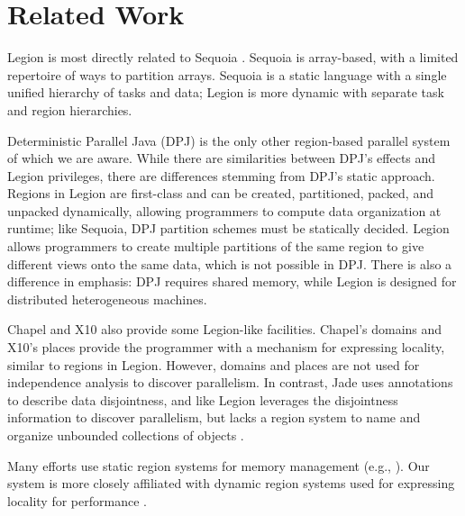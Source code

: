 
\section{Related Work}
\label{sec:related}
Legion is most directly related to Sequoia \cite{Fatahalian06}.  Sequoia is array-based, with
a limited repertoire of ways to partition arrays.  Sequoia is a static language with a single unified hierarchy
of tasks and data; Legion is more dynamic with separate task and region hierarchies.

Deterministic Parallel Java (DPJ) is the only other region-based parallel system of which we are
aware\cite{Bocchino09}.  While there are similarities between DPJ's effects and Legion privileges, 
there are differences stemming from DPJ's static approach.
Regions in Legion are first-class and can be created, partitioned, packed, and unpacked 
dynamically, allowing programmers to compute data organization at runtime; like Sequoia, DPJ
partition schemes must be statically decided.  Legion allows 
programmers to create multiple partitions of the same region to give different 
views onto the same data, which is not possible in DPJ.  
There is also a difference in emphasis: DPJ requires shared memory, while Legion 
is designed for distributed heterogeneous machines.

Chapel \cite{Chamberlain:Chapel} and X10 \cite{X1005} also provide some Legion-like facilities.
Chapel's domains and X10's places provide the programmer with a 
mechanism for expressing locality, similar to regions in Legion.  However, domains
and places are not used for independence analysis to discover parallelism.
In contrast, Jade uses annotations to describe
data disjointness,  and like Legion leverages the disjointness information
to discover parallelism, but lacks a region system to name and organize unbounded collections of objects \cite{Rinard98}.  

Many efforts use static region systems for  memory management (e.g., \cite{Tofte94, Grossman02}).
Our system is more closely affiliated with dynamic region systems used for expressing locality for performance \cite{Gay01}.


